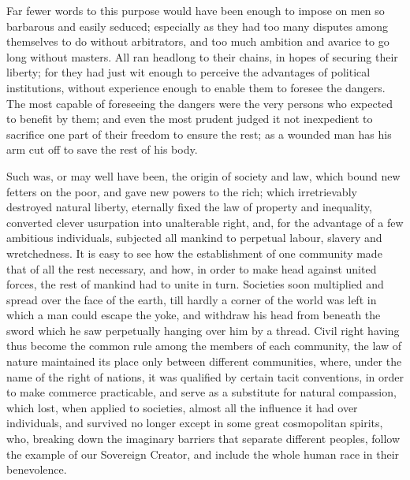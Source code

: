 \documentclass[12pt]{report}
\begin{document}
Far fewer words to this purpose would have been enough to impose on men so barbarous and easily seduced; especially as they had too many disputes among themselves to do without arbitrators, and too much ambition and avarice to go long without masters. All ran headlong to their chains, in hopes of securing their liberty; for they had just wit enough to perceive the advantages of political institutions, without experience enough to enable them to foresee the dangers. The most capable of foreseeing the dangers were the very persons who expected to benefit by them; and even the most prudent judged it not inexpedient to sacrifice one part of their freedom to ensure the rest; as a wounded man has his arm cut off to save the rest of his body.

Such was, or may well have been, the origin of society and law, which bound new fetters on the poor, and gave new powers to the rich; which irretrievably destroyed natural liberty, eternally fixed the law of property and inequality, converted clever usurpation into unalterable right, and, for the advantage of a few ambitious individuals, subjected all mankind to perpetual labour, slavery and wretchedness. It is easy to see how the establishment of one community made that of all the rest necessary, and how, in order to make head against united forces, the rest of mankind had to unite in turn. Societies soon multiplied and spread over the face of the earth, till hardly a corner of the world was left in which a man could escape the yoke, and withdraw his head from beneath the sword which he saw perpetually hanging over him by a thread. Civil right having thus become the common rule among the members of each community, the law of nature maintained its place only between different communities, where, under the name of the right of nations, it was qualified by certain tacit conventions, in order to make commerce practicable, and serve as a substitute for natural compassion, which lost, when applied to societies, almost all the influence it had over individuals, and survived no longer except in some great cosmopolitan spirits, who, breaking down the imaginary barriers that separate different peoples, follow the example of our Sovereign Creator, and include the whole human race in their benevolence.
\end{document}
